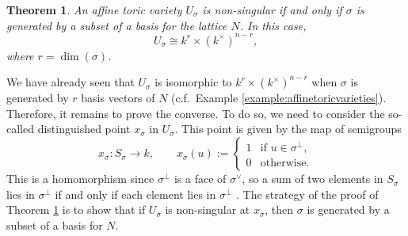 \documentclass[12pt]{amsart}
\theoremstyle{plain}
\newtheorem{theorem}{Theorem}[subsection]
\theoremstyle{definition}
\begin{document}
\begin{theorem}\label{theorem:singularities}
An affine toric variety $U_\sigma$ is non-singular if and only if $\sigma$ is generated by a subset of a basis for the lattice $N$.
In this case,
$$U_\sigma \cong k^r \times (k^\times)^{n-r},$$
where $r = \dim(\sigma)$.
\end{theorem}

We have already seen that $U_\sigma$ is isomorphic to $k^r \times (k^\times)^{n-r}$ when $\sigma$ is generated by $r$ basis vectors of $N$ (c.f.\ Example \ref{example:affinetoricvarieties}).
Therefore, it remains to prove the converse.
To do so, we need to consider the so-called distinguished point $x_\sigma$ in $U_\sigma$.
This point is given by the map of semigroups
$$x_\sigma : S_\sigma \to k, \qquad x_\sigma(u) := \begin{cases} 1 & \text{if } u \in \sigma^\perp, \\ 0 & \text{otherwise.} \end{cases}$$
This is a homomorphism since $\sigma^\perp$ is a face of $\sigma^\vee$, so a sum of two elements in $S_\sigma$ lies in $\sigma^\perp$ if and only if each element lies in $\sigma^\perp$ \cite[\S 2.1]{Fulton93}.
The strategy of the proof of Theorem \ref{theorem:singularities} is to show that if $U_\sigma$ is non-singular at $x_\sigma$, then $\sigma$ is generated by a subset of a basis for $N$.
\end{document}
